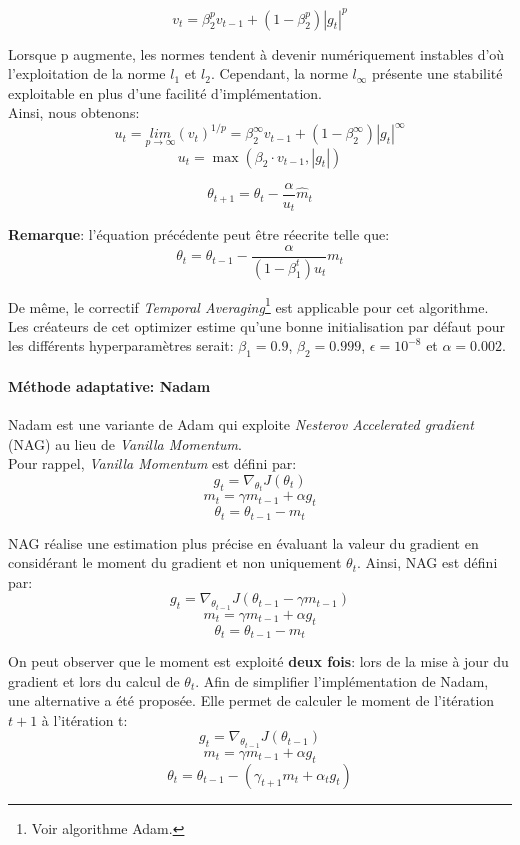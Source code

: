 $$v_t = \beta_2^p v_{t-1} + (1 - \beta_2^p) |g_t|^p$$

\noindent Lorsque p augmente, les normes tendent à devenir numériquement instables d'où l'exploitation de la norme $l_1$ et $l_2$. Cependant, la norme $l_\infty$ présente une stabilité exploitable en plus d'une facilité d'implémentation.\\

\noindent Ainsi, nous obtenons:
$$u_t = \underset{p \rightarrow \infty}{lim} (v_t)^{1/p} = \beta_2^\infty v_{t-1} + (1 - \beta_2^\infty) |g_t|^\infty$$
$$u_t = \max(\beta_2 \cdot v_{t-1}, |g_t|)$$

$$\theta_{t+1} = \theta_{t} - \dfrac{\alpha}{u_t} \hat{m}_t$$

\noindent \textbf{Remarque}: l'équation précédente peut être réecrite telle que:
$$\theta_{t} = \theta_{t-1} - \frac{\alpha}{(1-\beta_1^t)u_t}m_t$$

\noindent De même, le correctif \textit{Temporal Averaging}\footnote{Voir algorithme Adam.} est applicable pour cet algorithme.  Les créateurs de cet optimizer estime qu'une bonne initialisation par défaut pour les différents hyperparamètres serait: $\beta_1=0.9$, $\beta_2=0.999$, $\epsilon=10^{-8}$ et $\alpha=0.002$.\\

\paragraph{Méthode adaptative: Nadam}
Nadam\cite{Nadam} est une variante de Adam qui exploite \textit{Nesterov Accelerated gradient} (NAG) au lieu de \textit{Vanilla Momentum}. \\

\noindent Pour rappel, \textit{Vanilla Momentum} est défini par:
$$g_t = \nabla_{\theta_t}J(\theta_t)$$
$$m_t = \gamma m_{t-1} + \alpha g_t$$
$$\theta_{t} = \theta_{t-1} - m_t$$

\noindent NAG réalise une estimation plus précise en évaluant la valeur du gradient en considérant le moment du gradient et non uniquement $\theta_t$. Ainsi, NAG est défini par:
$$g_t = \nabla_{\theta_{t-1}}J(\theta_{t-1} - \gamma m_{t-1})$$
$$m_t = \gamma m_{t-1} + \alpha g_t$$
$$\theta_{t} = \theta_{t-1} - m_t$$

\noindent On peut observer que le moment est exploité \textbf{deux fois}: lors de la mise à jour du gradient et lors du calcul de $\theta_{t}$. Afin de simplifier l'implémentation de Nadam, une alternative a été proposée. Elle permet de calculer le moment de l'itération $t+1$ à l'itération t:
$$g_t = \nabla_{\theta_{t-1}}J(\theta_{t-1})$$
$$m_t = \gamma m_{t-1} + \alpha g_t$$
$$\theta_{t} = \theta_{t-1} - (\gamma_{t+1} m_t + \alpha_t g_t)$$

